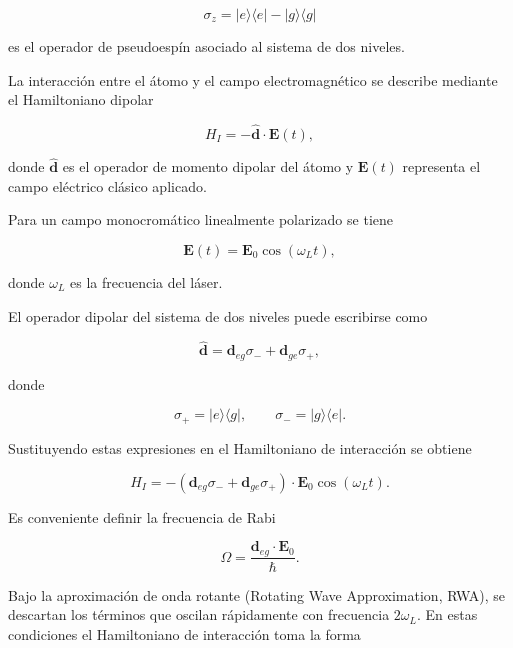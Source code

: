 \documentclass[11pt]{report}
\begin{document}
\begin{equation}
\sigma_z = |e\rangle\langle e| - |g\rangle\langle g|
\end{equation}

es el operador de pseudoespín asociado al sistema de dos niveles.

La interacción entre el átomo y el campo electromagnético se describe mediante el Hamiltoniano dipolar

\begin{equation}
H_I = -\hat{\mathbf{d}}\cdot \mathbf{E}(t),
\end{equation}

donde $\hat{\mathbf{d}}$ es el operador de momento dipolar del átomo y $\mathbf{E}(t)$ representa el campo eléctrico clásico aplicado.

Para un campo monocromático linealmente polarizado se tiene

\begin{equation}
\mathbf{E}(t) = \mathbf{E}_0 \cos(\omega_L t),
\end{equation}

donde $\omega_L$ es la frecuencia del láser.

El operador dipolar del sistema de dos niveles puede escribirse como

\begin{equation}
\hat{\mathbf{d}} =
\mathbf{d}_{eg}\sigma_- + \mathbf{d}_{ge}\sigma_+ ,
\end{equation}

donde

\begin{equation}
\sigma_+ = |e\rangle\langle g|, \qquad
\sigma_- = |g\rangle\langle e|.
\end{equation}

Sustituyendo estas expresiones en el Hamiltoniano de interacción se obtiene

\begin{equation}
H_I = -(\mathbf{d}_{eg}\sigma_- + \mathbf{d}_{ge}\sigma_+)\cdot \mathbf{E}_0 \cos(\omega_L t).
\end{equation}

Es conveniente definir la frecuencia de Rabi

\begin{equation}
\Omega = \frac{\mathbf{d}_{eg}\cdot \mathbf{E}_0}{\hbar}.
\end{equation}

Bajo la aproximación de onda rotante (Rotating Wave Approximation, RWA), se descartan los términos que oscilan rápidamente con frecuencia $2\omega_L$. En estas condiciones el Hamiltoniano de interacción toma la forma
\end{document}
